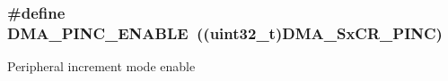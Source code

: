 \subsubsection[{\texorpdfstring{D\+M\+A\+\_\+\+P\+I\+N\+C\+\_\+\+E\+N\+A\+B\+LE}{DMA_PINC_ENABLE}}]{\setlength{\rightskip}{0pt plus 5cm}\#define D\+M\+A\+\_\+\+P\+I\+N\+C\+\_\+\+E\+N\+A\+B\+LE~((uint32\+\_\+t)D\+M\+A\+\_\+\+Sx\+C\+R\+\_\+\+P\+I\+NC)}\hypertarget{group___d_m_a___peripheral__incremented__mode_gab6d84e5805302516d26c06fb4497a346}{}\label{group___d_m_a___peripheral__incremented__mode_gab6d84e5805302516d26c06fb4497a346}
Peripheral increment mode enable 